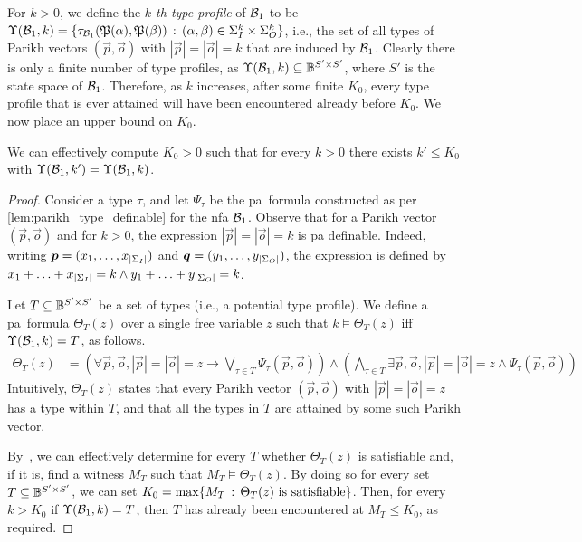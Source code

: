 For $k>0$, we define the \emph{$k$-th type profile} of $\mathcal{B}_1$ to be $\Upsilon(\mathcal{B}_1,k)=\{\tau_{\mathcal{B}_1}(\mathfrak{P}(\alpha),\mathfrak{P}(\beta))\, :\, (\alpha,\beta)\in \Sigma_{I}^k \times \Sigma_{O}^k\}$, i.e., the set of all types of Parikh vectors $(\vec{p},\vec{o})$ with $|\vec{p}|=|\vec{o}|=k$ that are induced by $\mathcal{B}_1$. Clearly there is only a finite number of type profiles, as $\Upsilon(\mathcal{B}_1,k)\subseteq \mathbb{B}^{S'\times S'}$, where $S'$ is the state space of $\mathcal{B}_1$. Therefore, as $k$ increases, after some finite $K_0$, every type profile that is ever attained will have been encountered already before $K_0$. We now place an upper bound on $K_0$.

\begin{lemma}
	\label{lem:type_profile_bound}
	We can effectively compute $K_0>0$ such that for every $k>0$ there exists $k'\le K_0$ with $\Upsilon(\mathcal{B}_1,k')=\Upsilon(\mathcal{B}_1,k)$.
	\end{lemma}
\begin{proof}
	Consider a type $\tau$, and let $\Psi_\tau$ be the \gls{pa}~formula constructed as per \autoref{lem:parikh_type_definable} for the \gls{nfa} $\mathcal{B}_1$. Observe that for a Parikh vector $(\vec{p},\vec{o})$ and for $k>0$, the expression $|\vec{p}|=|\vec{o}|=k$ is \gls{pa} definable. Indeed, writing $\boldsymbol{p}=(x_1,\ldots,x_{|\Sigma_{I}|})$ and $\boldsymbol{q}=(y_1,\ldots,y_{|\Sigma_{O}|})$, the expression is defined by $x_1+\ldots+x_{|\Sigma_{I}|}=k \wedge y_1+\ldots+y_{|\Sigma_{O}|}=k$.
	
	Let $T\subseteq \mathbb{B}^{S'\times S'}$ be a set of types (i.e., a potential type profile). We define a \gls{pa}~formula $\Theta_T(z)$ over a single free variable $z$ such that $k\models \Theta_T(z)$ iff $\Upsilon(\mathcal{B}_1,k)=T$, as follows.
	\begin{align*}
		\Theta_T(z)&=\left(\forall \vec{p},\vec{o}, |\vec{p}|=|\vec{o}|=z \to \bigvee_{\tau\in T}\Psi_\tau(\vec{p},\vec{o})\right)
		\wedge \left(\bigwedge_{\tau\in T}\exists \vec{p},\vec{o}, |\vec{p}|=|\vec{o}|=z \wedge \Psi_\tau(\vec{p},\vec{o})\right)
	\end{align*}
Intuitively, $\Theta_T(z)$ states that every Parikh vector $(\vec{p},\vec{o})$ with $|\vec{p}|=|\vec{o}|=z$ has a type within $T$, and that all the types in $T$ are attained by some such Parikh vector.

By~\cite{Fischer1974,Borosh1976}, we can effectively determine for every $T$ whether $\Theta_T(z)$ is satisfiable and, if it is, find a witness $M_T$ such that $M_T\models \Theta_T(z)$. By doing so for every set $T\subseteq \mathbb{B}^{S'\times S'}$, we can set $K_0=\max\{M_T\, :\, \Theta_T(z) \text{ is satisfiable}\}$. Then, for every $k>K_0$ if $\Upsilon(\mathcal{B}_1,k)=T$, then $T$ has already been encountered at $M_T\le K_0$, as required. 
\end{proof}

